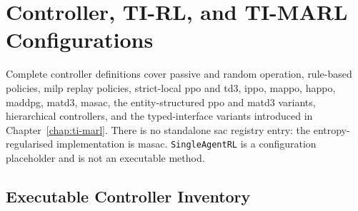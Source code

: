 \section{Controller, TI-RL, and TI-MARL Configurations}
\label{app:controller-configurations}

Complete controller definitions cover passive and random operation, rule-based policies, \gls{milp} replay policies, strict-local \gls{ppo} and \gls{td3}, \gls{ippo}, \gls{mappo}, \gls{happo}, \gls{maddpg}, \gls{matd3}, \gls{masac}, the entity-structured \gls{ppo} and \gls{matd3} variants, hierarchical controllers, and the typed-interface variants introduced in Chapter~\ref{chap:ti-marl}. There is no standalone \gls{sac} registry entry: the entropy-regularised implementation is \gls{masac}. \texttt{SingleAgentRL} is a configuration placeholder and is not an executable method.

\subsection{Executable Controller Inventory}

